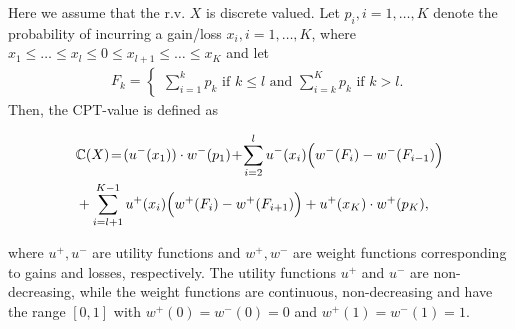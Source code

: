 Here we assume that the r.v. $X$ is discrete valued. 
Let $p_i, i=1,\ldots,K$ denote the probability of incurring a gain/loss $x_i, i=1,\ldots,K$, where 
$x_1\le \ldots \le x_l \le 0 \le x_{l+1} \le \ldots \le x_K$ and  let
\begin{align}
\label{eq:Fk}
 F_k = 
\begin{cases}
   \sum_{i=1}^k p_k  \text{ if   } k \leq l \text{ and }
   \sum_{i=k}^K p_k  \text{ if  }  k > l.
\end{cases}  
\end{align}
Then, the CPT-value is defined as 
\begin{small}
\begin{align*}
&\mathbb{C}(X) \!=\! (u^-(x_1))\cdot w^-(p_1) 
\!+\!\sum_{i=2}^l u^-(x_i) \Big(w^-(F_i) - w^-(F_{i-1})\Big) \\
& + \sum_{i=l+1}^{K-1} u^+(x_i) \Big(w^+(F_i) - w^+(F_{i+1}) \Big)
 + u^+(x_K)\cdot w^+(p_K),
\end{align*} 
\end{small}
where $u^+, u^-$ are utility functions and $w^+, w^-$ are weight functions corresponding to gains and losses, respectively. The utility functions $u^+$ and $u^-$ are non-decreasing, while the weight functions are continuous, non-decreasing and have the range $[0,1]$ with $w^+(0)=w^-(0)=0$ and $w^+(1)=w^-(1)=1$. 

